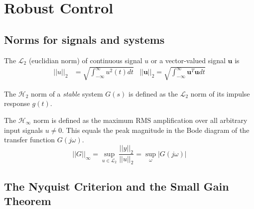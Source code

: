 
\section{Robust Control}

\subsection{Norms for signals and systems}
The $\mathcal{L}_2$ (euclidian norm) of continuous signal $u$ or a vector-valued signal $\mathbf{u}$ is
\begin{align*}
    ||u||_2 &= \sqrt{\int_{-\infty}^{\infty} u^2(t) dt} &
    ||\mathbf{u}||_2 = \sqrt{\int_{-\infty}^{\infty} \mathbf{u}^T \mathbf{u} dt}
\end{align*}

The $\mathcal{H}_2$ norm of a \emph{stable} system $G(s)$ is defined as the $\mathcal{L}_2$
norm of its impulse response $g(t)$.

The $\mathcal{H}_{\infty}$ norm is defined as the maximum RMS amplification over all arbitrary input signals $u\neq 0$.
This equals the peak magnitude in the Bode diagram of the transfer function $G(j\omega)$.
\[
    ||G||_{\infty} = \sup_{u \in \mathcal{L}_2} \frac{||y||_2}{||u||_2} = \sup_{\omega} |G(j\omega)|
\]

\subsection{The Nyquist Criterion and the Small Gain Theorem}

